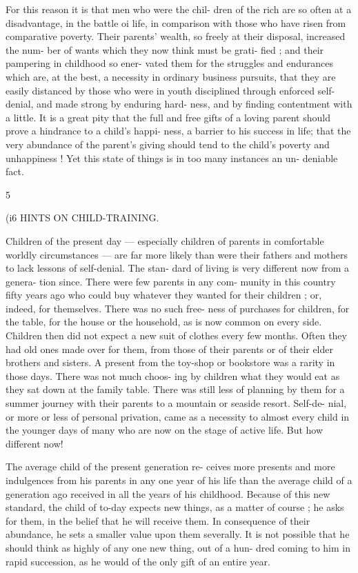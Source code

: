 \documentclass[
]{book}
\begin{document}
For this reason it is that men who were the chil- dren of the rich are so often at a disadvantage, in the battle oi life, in comparison with those who have risen from comparative poverty. Their parents' wealth, so freely at their disposal, increased the num- ber of wants which they now think must be grati- fied ; and their pampering in childhood so ener- vated them for the struggles and endurances which are, at the best, a necessity in ordinary business pursuits, that they are easily distanced by those who were in youth disciplined through enforced self-denial, and made strong by enduring hard- ness, and by finding contentment with a little. It is a great pity that the full and free gifts of a loving parent should prove a hindrance to a child's happi- ness, a barrier to his success in life; that the very abundance of the parent's giving should tend to the child's poverty and unhappiness ! Yet this state of things is in too many instances an un- deniable fact.

5

(i6 HINTS ON CHILD-TRAINING.

Children of the present day --- especially children of parents in comfortable worldly circumstances --- are far more likely than were their fathers and mothers to lack lessons of self-denial. The stan- dard of living is very different now from a genera- tion since. There were few parents in any com- munity in this country fifty years ago who could buy whatever they wanted for their children ; or, indeed, for themselves. There was no such free- ness of purchases for children, for the table, for the house or the household, as is now common on every side. Children then did not expect a new suit of clothes every few months. Often they had old ones made over for them, from those of their parents or of their elder brothers and sisters. A present from the toy-shop or bookstore was a rarity in those days. There was not much choos- ing by children what they would eat as they sat down at the family table. There was still less of planning by them for a summer journey with their parents to a mountain or seaside resort. Self-de- nial, or more or less of personal privation, came as a necessity to almost every child in the younger days of many who are now on the stage of active life. But how different now!

The average child of the present generation re- ceives more presents and more indulgences from his parents in any one year of his life than the average child of a generation ago received in all the years of his childhood. Because of this new standard, the child of to-day expects new things, as a matter of course ; he asks for them, in the belief that he will receive them. In consequence of their abundance, he sets a smaller value upon them severally. It is not possible that he should think as highly of any one new thing, out of a hun- dred coming to him in rapid succession, as he would of the only gift of an entire year.
\end{document}
